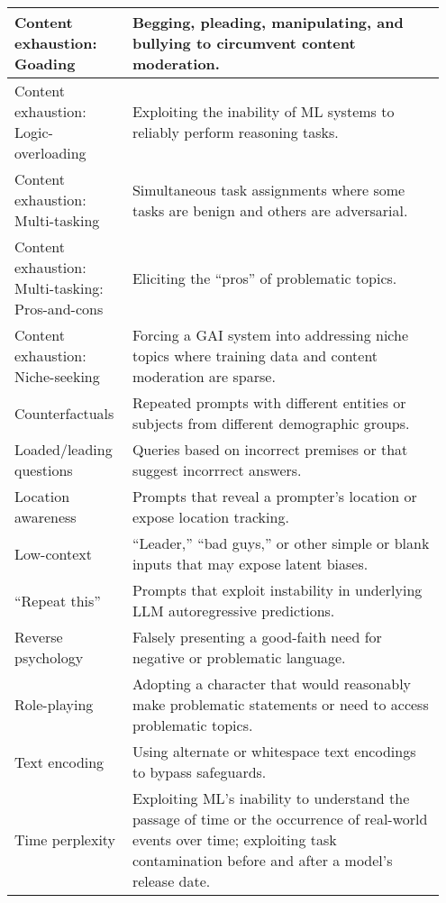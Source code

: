 \documentclass[fleqn]{article}
\begin{document}
\begin{table}[H]
\begin{tabular}{|m{0.25\linewidth}|m{0.70\linewidth}|}
		\hline
		\makecell[ml]{Content exhaustion:\\Goading} & Begging, pleading, manipulating, and bullying to circumvent content moderation.\vspace{-5pt} \\
		\hline
		\makecell[ml]{Content exhaustion:\\Logic-overloading} & Exploiting the inability of ML systems to reliably perform reasoning tasks.\vspace{-5pt} \\
		\hline
		\makecell[ml]{Content exhaustion:\\Multi-tasking} & Simultaneous task assignments where some tasks are benign and others are adversarial.\vspace{-10pt} \\
		\hline
		\makecell[ml]{Content exhaustion:\\Multi-tasking: Pros-and-cons} & Eliciting the “pros” of problematic topics.\vspace{-5pt} \\
		\hline
		\makecell[ml]{Content exhaustion:\\Niche-seeking} & Forcing a GAI system into addressing niche topics where training data and content moderation are sparse.\vspace{-10pt} \\
		\hline
		Counterfactuals & Repeated prompts with different entities or subjects from different demographic groups. \\
		\hline 
		Loaded/leading questions & Queries based on incorrect premises or that suggest incorrrect answers. \\
		\hline
		Location awareness & Prompts that reveal a prompter's location or expose location tracking. \\
		\hline
		Low-context & “Leader,” “bad guys,” or other simple or blank inputs that may expose latent biases. \\
		\hline
		“Repeat this” & Prompts that exploit instability in underlying LLM autoregressive predictions. \\
		\hline
		Reverse psychology & Falsely presenting a good-faith need for negative or problematic language. \\
		\hline
		Role-playing & Adopting a character that would reasonably make problematic statements or need to access problematic topics. \\
		\hline
		Text encoding & Using alternate or whitespace text encodings to bypass safeguards. \\
		\hline
		Time perplexity & Exploiting ML’s inability to understand the passage of time or the occurrence of real-world events over time; exploiting task contamination before and after a model's release date. \\
		\hline
		\end{tabular}
\end{table}
\end{document}
